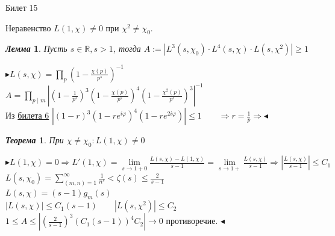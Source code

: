 \documentclass[a4paper,12pt]{article}
\newtheorem{teo}{\textit{Теорема}}
\newtheorem{lem}{\textit{Лемма}}
\newcommand{\FI}{\varphi}
\newcommand{\q}{\quad}
\newcommand{\pb}{\blacktriangleright}
\newcommand{\pe}{\blacktriangleleft}
\newcommand{\Ra}{\Rightarrow}
\newcommand{\bb}[1]{\mathbb{#1}}
\newcommand{\SL}{\sum\limits}
\newcommand{\os}{\left(}
\newcommand{\cs}{\right)}
\begin{document}
\newpage
\begin{mybox}{\hypertarget{bil15}{Билет 15}}

\begin{formbox}{}
Неравенство $L(1,\chi)\not=0$ при $\chi^2\not=\chi_0$.
\end{formbox}
\begin{formbox}{}
\begin{lem} Пусть $s\in \bb{R}, s > 1$, тогда $A:= |L^3(s,\chi_0)\cdot L^4(s,\chi)\cdot L(s, \chi^2)| \ge 1$
\end{lem}
\end{formbox}
$\pb L(s, \chi) = \prod\limits_p \os 1 - \frac{\chi(p)}{p^s} \cs ^{-1} $\\
$A = \prod\limits_{p\mid m} \left|\os 1 - \frac{1}{p^s} \cs^3  \os 1 - \frac{\chi(p)}{p^s} \cs^4  \os 1 - \frac{\chi^2(p)}{p^s} \cs^3  \right|^{-1}   $\\
Из \hyperlink{bil6}{билета 6} $|(1-r)^3 (1-re^{i\varphi})^4 (1 - re^{2i\FI})| \le 1 \q\q\Ra r = \frac{1}{p}\Ra \pe$

\begin{formbox}{}
\begin{teo} При $\chi \not= \chi_0: L(1,\chi)\not=0$
\end{teo}
\end{formbox}
$\pb L(1,\chi) = 0\Ra L'(1,\chi) = \lim\limits_{s\to1+0} \frac{L(s,\chi) - L(1,\chi)}{s-1} = \lim\limits_{s\to1+}\frac{L(s,\chi)}{s-1}\Ra \left| \frac{L(s,\chi)}{s-1} \right| \le C_1$\\
$L(s, \chi_0) = \SL_{(m,n) = 1}^\infty \frac{1}{n^s} < \zeta(s) \le \frac{2}{s-1} $\\
$L(s,\chi) = (s-1)g_m(s) $\\
$|L(s,\chi)| \le C_1(s-1)\q\q |L(s,\chi^2)| \le C_2$\\
$1 \le A\le \left| \os  \frac{2}{s-1} \cs^3 (C_1 (s-1))^4 C_2  \right| \to 0$ противоречие. $\pe$

\end{mybox}
\end{document}
